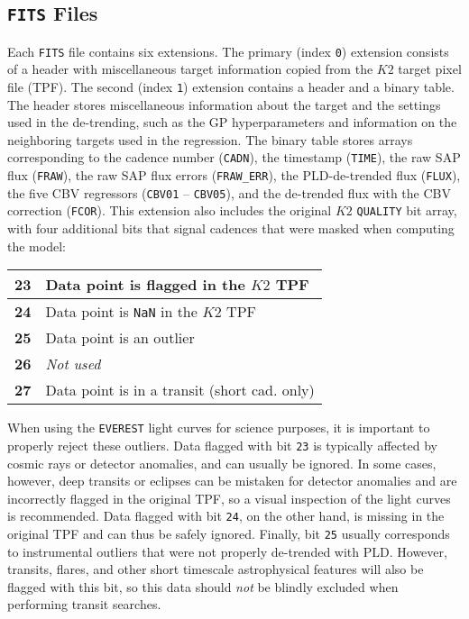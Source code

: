\documentclass[]{emulateapj}
\begin{document}
\subsection{\texttt{FITS} Files}
\label{sec:fits}
Each \texttt{FITS} file contains six extensions. The primary (index \texttt{0}) 
extension consists of a header with miscellaneous target information copied from
the $K2$ target pixel file (TPF). The second (index \texttt{1}) extension contains
a header and a binary table. The header stores miscellaneous
information about the target and the settings used in the de-trending, such as the 
GP hyperparameters and information on the neighboring targets used in the regression.
The binary table stores arrays corresponding to the cadence number (\texttt{CADN}),
the timestamp (\texttt{TIME}), the raw SAP flux (\texttt{FRAW}), the raw SAP flux errors
(\texttt{FRAW\_ERR}), the PLD-de-trended flux (\texttt{FLUX}), the five CBV regressors
(\texttt{CBV01} -- \texttt{CBV05}), and the de-trended flux with the CBV
correction (\texttt{FCOR}). This extension also includes the
original $K2$ \texttt{QUALITY} bit array, with four additional bits that signal
cadences that were masked when computing the model: 
%
\begin{center}
\begin{tabular}{ |l|l| }
  \hline
  \textbf{23} & Data point is flagged in the $K2$ TPF \\
  \hline
  \textbf{24} & Data point is \texttt{NaN} in the $K2$ TPF \\
  \hline
  \textbf{25} & Data point is an outlier \\
  \hline
  \textbf{26} & \emph{Not used} \\
  \hline
  \textbf{27} & Data point is in a transit (short cad. only) \\
  \hline
\end{tabular}
\end{center}
%
When using the \texttt{EVEREST} light curves for science purposes, it is important
to properly reject these outliers. Data flagged with bit \texttt{23} is typically 
affected by cosmic rays or detector anomalies, and can usually be ignored. In
some cases, however, deep transits or eclipses can be mistaken for detector
anomalies and are incorrectly flagged in the original TPF, so a visual inspection
of the light curves is recommended. Data flagged with bit \texttt{24}, on the other
hand, is missing in the original TPF and can thus be safely ignored. Finally, bit
\texttt{25} usually corresponds to instrumental outliers that were not properly
de-trended with PLD. However, transits, flares, and other short timescale astrophysical
features will also be flagged with this bit, so this data should \emph{not} be
blindly excluded when performing transit searches.
  
\end{document}
